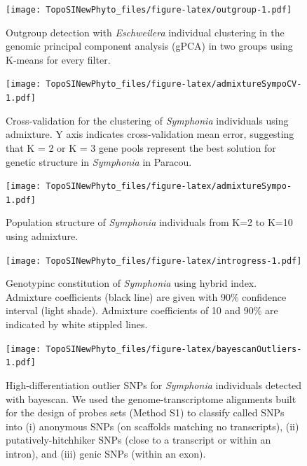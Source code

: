 \documentclass[12pt,]{article}
\begin{document}
\newpage

\begin{figure}
\centering
\texttt{[image: TopoSINewPhyto\_files/figure-latex/outgroup-1.pdf]}
\caption{\label{fig:outgroup}Outgroup detection with \emph{Eschweilera} individual clustering in the genomic principal component analysis (gPCA) in two groups using K-means for every filter.}
\end{figure}

\newpage

\begin{figure}
\centering
\texttt{[image: TopoSINewPhyto\_files/figure-latex/admixtureSympoCV-1.pdf]}
\caption{\label{fig:admixtureSympoCV}Cross-validation for the clustering of \emph{Symphonia} individuals using admixture. Y axis indicates cross-validation mean error, suggesting that K = 2 or K = 3 gene pools represent the best solution for genetic structure in \emph{Symphonia} in Paracou.}
\end{figure}

\newpage

\begin{figure}
\centering
\texttt{[image: TopoSINewPhyto\_files/figure-latex/admixtureSympo-1.pdf]}
\caption{\label{fig:admixtureSympo}Population structure of \emph{Symphonia} individuals from K=2 to K=10 using admixture.}
\end{figure}

\newpage

\begin{figure}
\centering
\texttt{[image: TopoSINewPhyto\_files/figure-latex/introgress-1.pdf]}
\caption{\label{fig:introgress}Genotypinc constitution of \emph{Symphonia} using hybrid index. Admixture coefficients (black line) are given with 90\% confidence interval (light shade). Admixture coefficients of 10 and 90\% are indicated by white stippled lines.}
\end{figure}

\newpage

\begin{figure}
\centering
\texttt{[image: TopoSINewPhyto\_files/figure-latex/bayescanOutliers-1.pdf]}
\caption{\label{fig:bayescanOutliers}High-differentiation outlier SNPs for \emph{Symphonia} individuals detected with bayescan. We used the genome-transcriptome alignments built for the design of probes sets (Method S1) to classify called SNPs into (i) anonymous SNPs (on scaffolds matching no transcripts), (ii) putatively-hitchhiker SNPs (close to a transcript or within an intron), and (iii) genic SNPs (within an exon).}
\end{figure}
\end{document}
